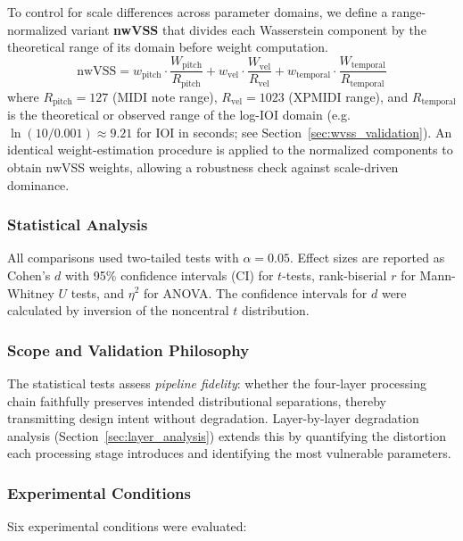 \documentclass[a4paper]{article}
\theoremstyle{definition}
\theoremstyle{remark}
\begin{document}
To control for scale differences across parameter domains, we define a range-normalized variant \textbf{nwVSS} that divides each Wasserstein component by the theoretical range of its domain before weight computation.
\begin{equation}
    \text{nwVSS} = w_{\text{pitch}} \cdot \frac{W_{\text{pitch}}}{R_{\text{pitch}}} + w_{\text{vel}} \cdot \frac{W_{\text{vel}}}{R_{\text{vel}}} + w_{\text{temporal}} \cdot \frac{W_{\text{temporal}}}{R_{\text{temporal}}}
\label{eq:nwvss}
\end{equation}
where $R_{\text{pitch}} = 127$ (MIDI note range), $R_{\text{vel}} = 1023$ (XPMIDI range), and $R_{\text{temporal}}$ is the theoretical or observed range of the log-IOI domain (e.g.\ $\ln(10/0.001) \approx 9.21$ for IOI in seconds; see Section~\ref{sec:wvss_validation}). An identical weight-estimation procedure is applied to the normalized components to obtain nwVSS weights, allowing a robustness check against scale-driven dominance.

\subsubsection{Statistical Analysis}

All comparisons used two-tailed tests with $\alpha = 0.05$. Effect sizes are reported as Cohen's $d$ with 95\% confidence intervals (CI) for $t$-tests, rank-biserial $r$ for Mann-Whitney $U$ tests, and $\eta^2$ for ANOVA. The confidence intervals for $d$ were calculated by inversion of the noncentral $t$ distribution.

\subsubsection{Scope and Validation Philosophy}

The statistical tests assess \emph{pipeline fidelity}: whether the four-layer processing chain faithfully preserves intended distributional separations, thereby transmitting design intent without degradation. Layer-by-layer degradation analysis (Section~\ref{sec:layer_analysis}) extends this by quantifying the distortion each processing stage introduces and identifying the most vulnerable parameters.

\subsubsection{Experimental Conditions}

Six experimental conditions were evaluated:
\end{document}
